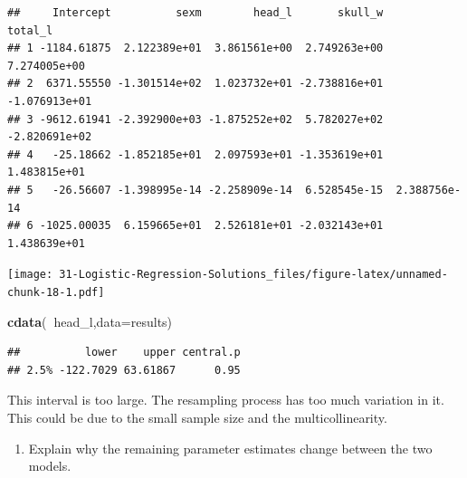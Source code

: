 \documentclass[
]{book}
\newenvironment{Shaded}{\begin{snugshade}}{\end{snugshade}}
\newcommand{\DataTypeTok}[1]{\textcolor[rgb]{0.13,0.29,0.53}{#1}}
\newcommand{\KeywordTok}[1]{\textcolor[rgb]{0.13,0.29,0.53}{\textbf{#1}}}
\newcommand{\NormalTok}[1]{#1}
\newcommand{\OperatorTok}[1]{\textcolor[rgb]{0.81,0.36,0.00}{\textbf{#1}}}
\newcommand{\StringTok}[1]{\textcolor[rgb]{0.31,0.60,0.02}{#1}}
\providecommand{\tightlist}{%
  \setlength{\itemsep}{0pt}\setlength{\parskip}{0pt}}
\begin{document}
\begin{verbatim}
##     Intercept          sexm        head_l       skull_w       total_l
## 1 -1184.61875  2.122389e+01  3.861561e+00  2.749263e+00  7.274005e+00
## 2  6371.55550 -1.301514e+02  1.023732e+01 -2.738816e+01 -1.076913e+01
## 3 -9612.61941 -2.392900e+03 -1.875252e+02  5.782027e+02 -2.820691e+02
## 4   -25.18662 -1.852185e+01  2.097593e+01 -1.353619e+01  1.483815e+01
## 5   -26.56607 -1.398995e-14 -2.258909e-14  6.528545e-15  2.388756e-14
## 6 -1025.00035  6.159665e+01  2.526181e+01 -2.032143e+01  1.438639e+01
\end{verbatim}

\begin{Shaded}
\end{Shaded}

\texttt{[image: 31-Logistic-Regression-Solutions\_files/figure-latex/unnamed-chunk-18-1.pdf]}

\begin{Shaded}
\begin{Highlighting}[]
\KeywordTok{cdata}\NormalTok{(}\OperatorTok{~}\NormalTok{head_l,}\DataTypeTok{data=}\NormalTok{results)}
\end{Highlighting}
\end{Shaded}

\begin{verbatim}
##          lower    upper central.p
## 2.5% -122.7029 63.61867      0.95
\end{verbatim}

This interval is too large. The resampling process has too much variation in it. This could be due to the small sample size and the multicollinearity.

\begin{enumerate}
\def\labelenumi{\alph{enumi}.}
\setcounter{enumi}{4}
\tightlist
\item
  Explain why the remaining parameter estimates change between the two models.
\end{enumerate}
\end{document}
